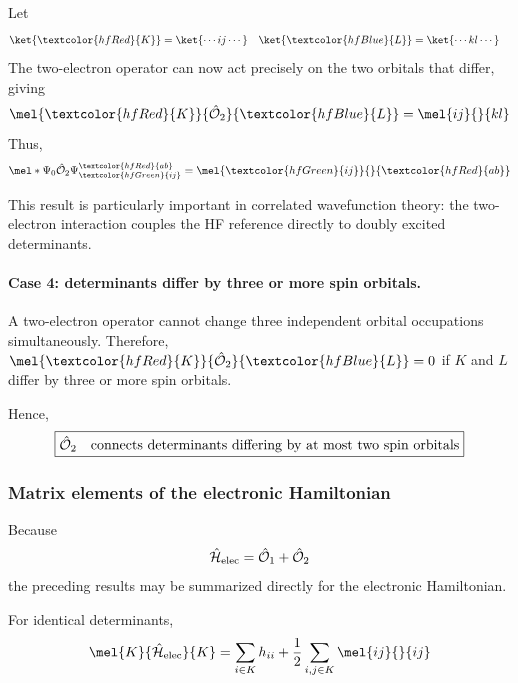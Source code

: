 \documentclass[11pt,a4paper,titlepage]{article}
\numberwithin{equation}{section}
\newcommand{\chO}{\Hat{\mathcal{O}}}
\newcommand{\chH}{\Hat{\mathcal{H}}}
\newcommand{\red}[1]{\textcolor{hfRed}{#1}}
\newcommand{\green}[1]{\textcolor{hfGreen}{#1}}
\newcommand{\blue}[1]{\textcolor{hfBlue}{#1}}
\begin{document}
Let
\begin{align}
  \ket{\red{K}}
  &=
  \ket{\cdots i j\cdots}
  &
  \ket{\blue{L}}
  &=
  \ket{\cdots k l\cdots}
\end{align}
The two-electron operator can now act precisely on the two orbitals that
differ, giving
\begin{equation}
  \mel{\red{K}}{\chO_2}{\blue{L}}
  =
  \mel{ij}{}{kl}
  \label{eq:sc-two-two}
\end{equation}
Thus,
\begin{equation}
  \mel*{\Psi_0}{\chO_2}
  {\Psi_{\green{ij}}^{\red{ab}}}
  =
  \mel{\green{ij}}{}{\red{ab}}
\end{equation}

This result is particularly important in correlated wavefunction theory:
the two-electron interaction couples the HF reference directly to doubly
excited determinants.

\paragraph{Case 4: determinants differ by three or more spin orbitals.}

A two-electron operator cannot change three independent orbital occupations
simultaneously. Therefore, $\mel{\red{K}}{\chO_2}{\blue{L}} = 0$
if $K$ and $L$ differ by three or more spin orbitals.

Hence,
\begin{equation}
  \boxed{
  \chO_2
  \quad\text{connects determinants differing by at most two spin orbitals}
  }
\end{equation}


\subsubsection{Matrix elements of the electronic Hamiltonian}

Because
\begin{equation}
  \chH_\text{elec}
  =
  \chO_1+\chO_2
\end{equation}
the preceding results may be summarized directly for the electronic
Hamiltonian.

For identical determinants,
\begin{equation}
  \mel{K}{\chH_\text{elec}}{K}
  =
  \sum_{i\in K}h_{ii}
  +
  \frac{1}{2}
  \sum_{i,j\in K}
  \mel{ij}{}{ij}
  \label{eq:sc-h-zero}
\end{equation}
\end{document}
